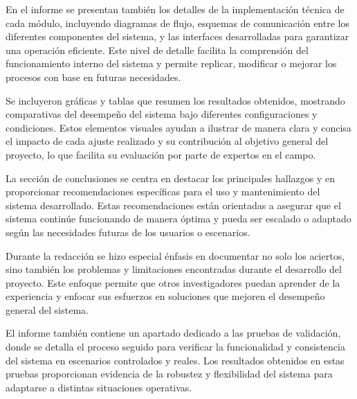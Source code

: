     En el informe se presentan tambi\'en los detalles de la implementaci\'on t\'ecnica de cada m\'odulo, 
    incluyendo diagramas de flujo, esquemas de comunicaci\'on entre los diferentes componentes 
    del sistema, y las interfaces desarrolladas para garantizar una operaci\'on eficiente. 
    Este nivel de detalle facilita la comprensi\'on del funcionamiento interno del sistema 
    y permite replicar, modificar o mejorar los procesos con base en futuras necesidades.

    \vskip 0.5cm

    Se incluyeron gr\'aficas y tablas que resumen los resultados obtenidos, mostrando 
        comparativas del desempe\~no del sistema bajo diferentes configuraciones y condiciones. 
        Estos elementos visuales ayudan a ilustrar de manera clara y concisa el impacto de cada 
        ajuste realizado y su contribuci\'on al objetivo general del proyecto, lo que facilita su 
        evaluaci\'on por parte de expertos en el campo.

    \vskip 0.5cm

    La secci\'on de conclusiones se centra en destacar los principales hallazgos y en 
        proporcionar recomendaciones espec\'ificas para el uso y mantenimiento del sistema 
        desarrollado. Estas recomendaciones est\'an orientadas a asegurar que el sistema 
        contin\'ue funcionando de manera \'optima y pueda ser escalado o adaptado seg\'un 
        las necesidades futuras de los usuarios o escenarios.

    \vskip 0.5cm

    Durante la redacci\'on se hizo especial \'enfasis en documentar no solo los aciertos, 
        sino tambi\'en los problemas y limitaciones encontradas durante el desarrollo del 
        proyecto. Este enfoque permite que otros investigadores puedan aprender de la experiencia 
        y enfocar sus esfuerzos en soluciones que mejoren el desempe\~no general del sistema.

    \vskip 0.5cm

    El informe tambi\'en contiene un apartado dedicado a las pruebas de validaci\'on, 
        donde se detalla el proceso seguido para verificar la funcionalidad y consistencia 
        del sistema en escenarios controlados y reales. Los resultados obtenidos en estas 
        pruebas proporcionan evidencia de la robustez y flexibilidad del sistema para 
        adaptarse a distintas situaciones operativas.
